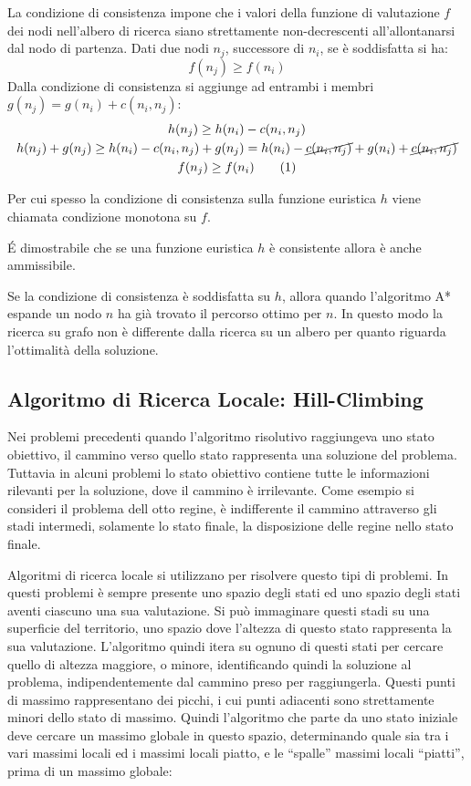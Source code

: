 \documentclass{article}
\numberwithin{equation}{subsection}
\newcommand{\tageq}{\tag{\stepcounter{equation}\theequation}}
\begin{document}
La condizione di consistenza impone che i valori della funzione di valutazione $f$ dei nodi 
nell'albero di ricerca siano strettamente non-decrescenti all'allontanarsi dal nodo di 
partenza. Dati due nodi $n_j$, successore di $n_i$, se è soddisfatta si ha:
\begin{equation*}
    f(n_j)\geq f(n_i)
\end{equation*}
Dalla condizione di consistenza si aggiunge ad entrambi i membri $g(n_j)=g(n_i)+c(n_i,n_j)$:
\begin{gather*}
    h(n_j)\geq h(n_i)-c(n_i,n_j)\\
    h(n_j)+g(n_j)\geq h(n_i)-c(n_i,n_j)+g(n_j)=h(n_i)-\cancel{c(n_i,n_j)}+g(n_i)+\cancel{c(n_i,n_j)}\\
    f(n_j)\geq f(n_i)\tageq
\end{gather*}

Per cui spesso la condizione di consistenza sulla funzione euristica $h$ viene chiamata 
condizione monotona su $f$. 

\'{E} dimostrabile che se una funzione euristica $h$ è consistente allora è anche ammissibile. 

Se la condizione di consistenza è soddisfatta su $h$, allora quando l'algoritmo A* espande un nodo 
$n$ ha già trovato il percorso ottimo per $n$. In questo modo la ricerca su grafo non è 
differente dalla ricerca su un albero per quanto riguarda l'ottimalità della soluzione. 

\subsection{Algoritmo di Ricerca Locale: Hill-Climbing}
\label{sec:hill-climbing}

Nei problemi precedenti quando l'algoritmo risolutivo raggiungeva uno stato obiettivo, il cammino verso quello stato rappresenta una soluzione 
del problema. Tuttavia in alcuni problemi lo stato obiettivo contiene tutte le informazioni rilevanti per la soluzione, dove il cammino è 
irrilevante. Come esempio si consideri il problema dell otto regine, è indifferente il cammino attraverso gli stadi intermedi, solamente lo 
stato finale, la disposizione delle regine nello stato finale. 

Algoritmi di ricerca locale si utilizzano per risolvere questo tipi di problemi. In questi problemi è sempre presente uno spazio degli stati 
ed uno spazio degli stati aventi ciascuno una sua valutazione. Si può immaginare questi stadi su una superficie del territorio, uno spazio dove l'altezza 
di questo stato rappresenta la sua valutazione. L'algoritmo quindi itera su ognuno di questi stati per cercare quello di altezza maggiore, o minore, identificando 
quindi la soluzione al problema, indipendentemente dal cammino preso per raggiungerla. Questi punti di massimo rappresentano dei picchi, i cui punti adiacenti sono 
strettamente minori dello stato di massimo. Quindi l'algoritmo che parte da uno stato iniziale deve cercare un massimo globale in questo spazio, determinando quale sia 
tra i vari massimi locali ed i massimi locali piatto, e le ``spalle'' massimi locali ``piatti'', prima di un massimo globale:
\end{document}

